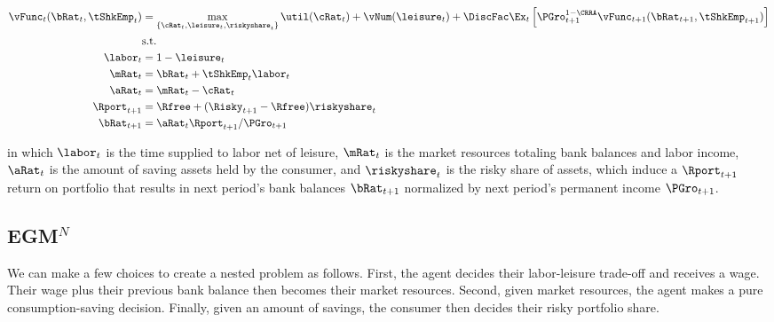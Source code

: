 \documentclass[\econtexRoot/EGMN]{subfiles}
\begin{document}
\begin{equation}
    \begin{split}
        \vFunc_{t}(\bRat_{t}, \tShkEmp_{t}) & = \max_{\{\cRat_{t},
            \leisure_{t}, \riskyshare_{t}\}} \util(\cRat_{t}) +
        \vNum(\leisure_{t}) +
        \DiscFac \Ex_{t} \left[ \PGro_{t+1}^{1-\CRRA}
            \vFunc_{t+1} (\bRat_{t+1},
            \tShkEmp_{t+1}) \right] \\
        & \text{s.t.} \\
        \labor_{t} & = 1 - \leisure_{t} \\
        \mRat_{t} & = \bRat_{t} + \tShkEmp_{t}\labor_{t} \\
        \aRat_{t} & = \mRat_{t} - \cRat_{t} \\
        \Rport_{t+1} & = \Rfree + (\Risky_{t+1} - \Rfree)
        \riskyshare_{t} \\
        \bRat_{t+1} & = \aRat_{t} \Rport_{t+1} / \PGro_{t+1}
    \end{split}
\end{equation}

in which $\labor_{t}$ is the time supplied to labor net of leisure, $\mRat_{t}$ is the market resources totaling bank balances and labor income, $\aRat_{t}$ is the amount of saving assets held by the consumer, and $\riskyshare_{t}$ is the risky share of assets, which induce a $\Rport_{t+1}$ return on portfolio that results in next period's bank balances $\bRat_{t+1}$ normalized by next period's permanent income $\PGro_{t+1}$.


\subsection{EGM$^N$}

We can make a few choices to create a nested problem as follows. First, the
agent decides their labor-leisure trade-off and receives a wage. Their wage
plus their previous bank balance then becomes their market resources. Second, given
market resources, the agent makes a pure consumption-saving decision. Finally, given an amount of savings, the consumer then decides their risky portfolio share.
\end{document}
